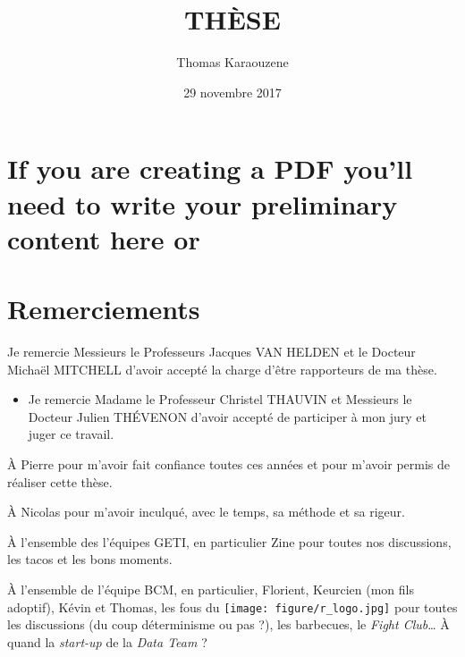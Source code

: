 \documentclass[12pt,twoside]{ugathesis}
\title{THÈSE}
\author{Thomas Karaouzene}
\date{29 novembre 2017}
\providecommand{\tightlist}{%
  \setlength{\itemsep}{0pt}\setlength{\parskip}{0pt}}
\begin{document}
  \maketitle

\frontmatter %
\pagestyle{empty} %



  \hypersetup{linkcolor=black}
  \setcounter{tocdepth}{3}
  \tableofcontents

  \listoftables

  \listoffigures



\mainmatter %
\pagestyle{fancyplain} %

\chapter{If you are creating a PDF you'll need to write your preliminary
content here
or}\label{if-you-are-creating-a-pdf-youll-need-to-write-your-preliminary-content-here-or}

\chapter*{Remerciements}\label{remerciements}

\newpage

Je remercie Messieurs le Professeurs Jacques VAN HELDEN et le Docteur
Michaël MITCHELL d'avoir accepté la charge d'être rapporteurs de ma
thèse.

\begin{itemize}
\tightlist
\item
  Je remercie Madame le Professeur Christel THAUVIN et Messieurs le
  Docteur Julien THÉVENON d'avoir accepté de participer à mon jury et
  juger ce travail.
\end{itemize}

À Pierre pour m'avoir fait confiance toutes ces années et pour m'avoir
permis de réaliser cette thèse.

À Nicolas pour m'avoir inculqué, avec le temps, sa méthode et sa rigeur.

À l'ensemble des l'équipes GETI, en particulier Zine pour toutes nos
discussions, les tacos et les bons moments.

À l'ensemble de l'équipe BCM, en particulier, Florient, Keurcien (mon
fils adoptif), Kévin et Thomas, les fous du
\texttt{[image: figure/r\_logo.jpg]} pour toutes
les discussions (du coup déterminisme ou pas ?), les barbecues, le
\emph{Fight Club}\ldots{} À quand la \emph{start-up} de la \emph{Data
Team} ?
\end{document}
